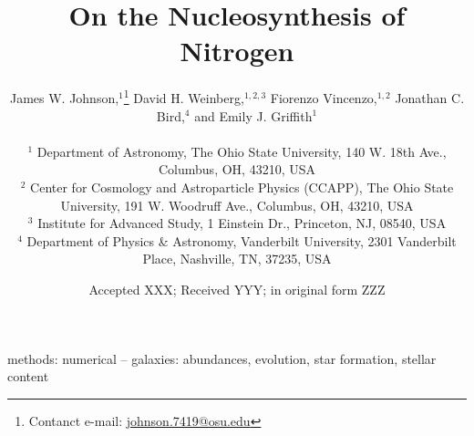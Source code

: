 \documentclass[fleqn, usenatbib]{mnras}
\title[On the Nucleosynthesis of Nitrogen]{On the Nucleosynthesis of Nitrogen}
\author[J.W. Johnson et al.]{James W. Johnson,$^{1}$\thanks{
	Contanct e-mail: \href{mailto:
	johnson.7419@osu.edu}{johnson.7419@osu.edu}} 
	David H. Weinberg,$^{1, 2, 3}$ 
	Fiorenzo Vincenzo,$^{1, 2}$ 
	Jonathan C. Bird,$^{4}$ 
	\newauthor 
	and Emily J. Griffith$^{1}$ 
	\\ \null \\ 
	$^{1}$ Department of Astronomy, The Ohio State University, 
	140 W. 18th Ave., Columbus, OH, 43210, USA 
	\\ 
	$^{2}$ Center for Cosmology and Astroparticle Physics (CCAPP), 
	The Ohio State University, 191 W. Woodruff Ave., Columbus, OH, 43210, USA 
	\\ 
	$^{3}$ Institute for Advanced Study, 1 Einstein Dr., Princeton, NJ, 08540, 
	USA 
	\\ 
	$^{4}$ Department of Physics \& Astronomy, Vanderbilt University, 
	2301 Vanderbilt Place, Nashville, TN, 37235, USA 
}
\date{Accepted XXX; Received YYY; in original form ZZZ}
\begin{document}
 
\label{firstpage} 
\pagerange{\pageref{firstpage}--\pageref{lastpage}} 
\maketitle 

 

\begin{keywords} 
methods: numerical -- galaxies: abundances, evolution, star formation, stellar 
content 
\end{keywords} 

 
 
 
 
 

 
 

\label{lastpage} 
\end{document}
